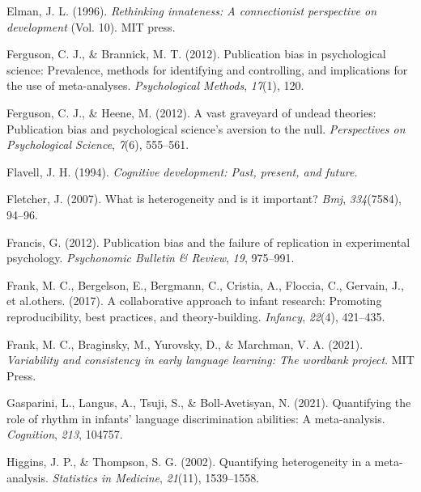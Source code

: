 \documentclass[
  man]{apa6}
\newlength{\cslhangindent}
\newlength{\cslentryspacingunit} %
\newenvironment{CSLReferences}[2] %
 {%
  \setlength{\parindent}{0pt}
  \ifodd #1
  \let\oldpar\par
  \def\par{\hangindent=\cslhangindent\oldpar}
  \fi
  \setlength{\parskip}{#2\cslentryspacingunit}
 }%
 {}
\begin{document}
\begin{CSLReferences}{1}{0}
\leavevmode{}%
Elman, J. L. (1996). \emph{Rethinking innateness: A connectionist perspective on development} (Vol. 10). MIT press.

\leavevmode{}%
Ferguson, C. J., \& Brannick, M. T. (2012). Publication bias in psychological science: Prevalence, methods for identifying and controlling, and implications for the use of meta-analyses. \emph{Psychological Methods}, \emph{17}(1), 120.

\leavevmode{}%
Ferguson, C. J., \& Heene, M. (2012). A vast graveyard of undead theories: Publication bias and psychological science's aversion to the null. \emph{Perspectives on Psychological Science}, \emph{7}(6), 555--561.

\leavevmode{}%
Flavell, J. H. (1994). \emph{Cognitive development: Past, present, and future.}

\leavevmode{}%
Fletcher, J. (2007). What is heterogeneity and is it important? \emph{Bmj}, \emph{334}(7584), 94--96.

\leavevmode{}%
Francis, G. (2012). Publication bias and the failure of replication in experimental psychology. \emph{Psychonomic Bulletin \& Review}, \emph{19}, 975--991.

\leavevmode{}%
Frank, M. C., Bergelson, E., Bergmann, C., Cristia, A., Floccia, C., Gervain, J., et al.others. (2017). A collaborative approach to infant research: Promoting reproducibility, best practices, and theory-building. \emph{Infancy}, \emph{22}(4), 421--435.

\leavevmode{}%
Frank, M. C., Braginsky, M., Yurovsky, D., \& Marchman, V. A. (2021). \emph{Variability and consistency in early language learning: The wordbank project}. MIT Press.

\leavevmode{}%
Gasparini, L., Langus, A., Tsuji, S., \& Boll-Avetisyan, N. (2021). Quantifying the role of rhythm in infants' language discrimination abilities: A meta-analysis. \emph{Cognition}, \emph{213}, 104757.

\leavevmode{}%
Higgins, J. P., \& Thompson, S. G. (2002). Quantifying heterogeneity in a meta-analysis. \emph{Statistics in Medicine}, \emph{21}(11), 1539--1558.


\end{CSLReferences}
\end{document}
